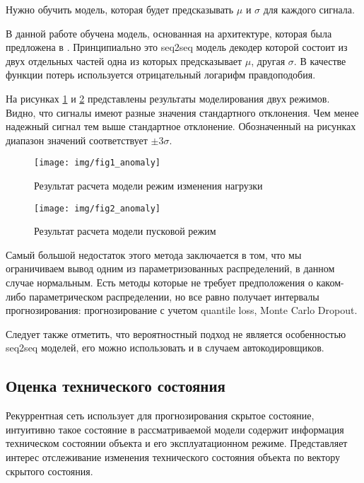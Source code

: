 \documentclass[12pt,a4paper]{article}
\begin{document}
Нужно обучить модель, которая будет предсказывать $\mu$ и $\sigma$ для каждого сигнала.

В данной работе обучена модель, основанная на архитектуре, которая была предложена в \cite{wang_smola}. Принципиально это seq2seq модель декодер которой состоит из двух отдельных частей одна из которых предсказывает $\mu$, другая $\sigma$. В качестве функции потерь используется отрицательный логарифм правдоподобия.
 
На рисунках \ref{fig:fig1_anomaly} и \ref{fig:fig2_anomaly} представлены результаты моделирования двух режимов. Видно, что сигналы имеют разные значения стандартного отклонения.  Чем менее надежный сигнал тем выше стандартное отклонение. Обозначенный на рисунках диапазон значений соответствует $\pm3\sigma$.
 
 \begin{figure}[htbp]
 	\centering\texttt{[image: img/fig1\_anomaly]}
 	\caption{Результат расчета модели режим изменения нагрузки}
 	\label{fig:fig1_anomaly}
 \end{figure}
 
 \begin{figure}[htbp]
 	\centering\texttt{[image: img/fig2\_anomaly]}
 	\caption{Результат расчета модели пусковой режим}
 	\label{fig:fig2_anomaly}
 \end{figure}
 
Самый большой недостаток этого метода заключается в том, что мы ограничиваем вывод одним из параметризованных распределений, в данном случае нормальным. Есть методы которые не требует предположения о каком-либо параметрическом распределении, но все равно получает интервалы прогнозирования: прогнозирование с учетом quantile loss, Monte Carlo Dropout.

Следует также отметить, что вероятностный подход не является особенностью seq2seq моделей, его можно использовать и в случаем автокодировщиков.


\newpage
\subsection{Оценка технического состояния}


Рекуррентная сеть использует для прогнозирования скрытое состояние, интуитивно такое состояние в рассматриваемой модели содержит информация техническом состоянии объекта и его эксплуатационном режиме. Представляет интерес отслеживание изменения технического состояния объекта по вектору скрытого состояния.
\end{document}
